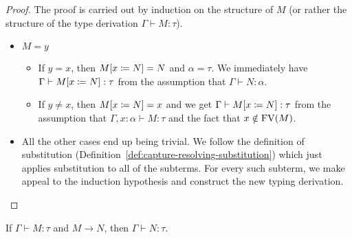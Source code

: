 \begin{proof}
  The proof is carried out by induction on the structure of $M$ (or rather
  the structure of the type derivation $\Gamma \vdash M : \tau$).

  \begin{itemize}
  \item $M = y$
    \begin{itemize}
    \item If $y = x$, then $M[x \coloneqq N] = N$ and $\alpha = \tau$. We
      immediately have $\Gamma \vdash M[x \coloneqq N] : \tau$ from the
      assumption that $\Gamma \vdash N : \alpha$.
    \item If $y \neq x$, then $M[x \coloneqq N] = x$ and we get
      $\Gamma \vdash M[x \coloneqq N] : \tau$ from the assumption that
      $\Gamma, x : \alpha \vdash M : \tau$ and the fact that
      $x \notin \operatorname{FV}(M)$.
    \end{itemize}
  
  \item All the other cases end up being trivial. We follow the definition
    of substitution (Definition~\ref{def:capture-resolving-substitution})
    which just applies substitution to all of the subterms. For every such
    subterm, we make appeal to the induction hypothesis and construct the
    new typing derivation.
  \end{itemize}
\end{proof}

\begin{property}\label{prop:subject-reduction}
  
  If $\Gamma \vdash M : \tau$ and $M \to N$, then $\Gamma \vdash N : \tau$.
\end{property}

